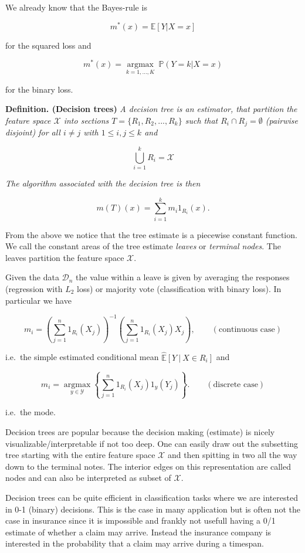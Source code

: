 \documentclass[a4paper,10pt,openany]{book}
\begin{document}
We already know that the Bayes-rule is

\[
m^\ast(x)=\mathbb E[Y|X=x]
\]

for the squared loss and

\[
m^\ast(x)=\underset{k=1,\dots,K}{\operatorname{argmax}}\ \mathbb P(Y=k|X=x)
\]

for the binary loss.

\textbf{Definition. (Decision trees)} \emph{A decision tree is an estimator, that partition the feature space \(\mathcal X\) into sections \(T=\{R_1,R_2,...,R_k\}\) such that \(R_i\cap R_j=\emptyset\) (pairwise disjoint) for all \(i\ne j\) with \(1\le i,j\le k\) and}

\[
\bigcup_{i=1}^kR_i=\mathcal X
\]

\emph{The algorithm associated with the decision tree is then}

\[
m(T)(x)=\sum_{i=1}^k m_i 1_{R_i}(x).
\]

From the above we notice that the tree estimate is a piecewise constant function. We call the constant areas of the tree estimate \emph{leaves} or \emph{terminal nodes}. The leaves partition the feature space \(\mathcal X\).

Given the data \(\mathcal D_n\) the value within a leave is given by averaging the responses (regression with \(L_2\) loss) or majority vote (classification with binary loss). In particular we have

\[
m_i=\left(\sum_{j=1}^n1_{R_i}(X_j)\right)^{-1}\left(\sum_{j=1}^n1_{R_i}(X_j)X_j\right),\qquad (\text{continuous case})
\]

i.e.~the simple estimated conditional mean \(\mathbb {\hat E}[Y\ \vert\ X\in R_i]\) and

\[
m_i=\underset{y\in \mathcal Y}{\operatorname{argmax}}\left\{\sum_{j=1}^n1_{R_i}(X_j)1_{y}(Y_j)\right\}.\qquad (\text{discrete case})
\]

i.e.~the mode.

Decision trees are popular because the decision making (estimate) is nicely visualizable/interpretable if not too deep. One can easily draw out the subsetting tree starting with the entire feature space \(\mathcal X\) and then spitting in two all the way down to the terminal notes. The interior edges on this representation are called nodes and can also be interpreted as subset of \(\mathcal X\).

Decision trees can be quite efficient in classification tasks where we are interested in 0-1 (binary) decisions. This is the case in many application but is often not the case in insurance since it is impossible and frankly not usefull having a 0/1 estimate of whether a claim may arrive. Instead the insurance company is interested in the probability that a claim may arrive during a timespan.
\end{document}
